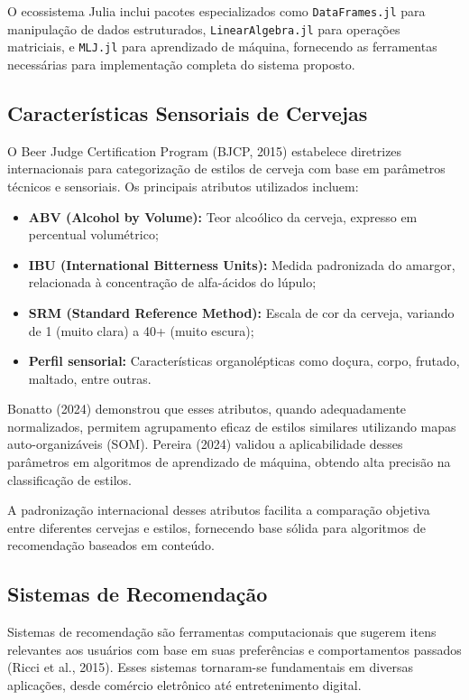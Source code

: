 \documentclass[12pt,a4paper]{article}
\begin{document}
O ecossistema Julia inclui pacotes especializados como \texttt{DataFrames.jl} para manipulação de dados estruturados, \texttt{LinearAlgebra.jl} para operações matriciais, e \texttt{MLJ.jl} para aprendizado de máquina, fornecendo as ferramentas necessárias para implementação completa do sistema proposto.

\subsection{Características Sensoriais de Cervejas}

O Beer Judge Certification Program (BJCP, 2015) estabelece diretrizes internacionais para categorização de estilos de cerveja com base em parâmetros técnicos e sensoriais. Os principais atributos utilizados incluem:

\begin{itemize}
\item \textbf{ABV (Alcohol by Volume):} Teor alcoólico da cerveja, expresso em percentual volumétrico;
\item \textbf{IBU (International Bitterness Units):} Medida padronizada do amargor, relacionada à concentração de alfa-ácidos do lúpulo;
\item \textbf{SRM (Standard Reference Method):} Escala de cor da cerveja, variando de 1 (muito clara) a 40+ (muito escura);
\item \textbf{Perfil sensorial:} Características organolépticas como doçura, corpo, frutado, maltado, entre outras.
\end{itemize}

Bonatto (2024) demonstrou que esses atributos, quando adequadamente normalizados, permitem agrupamento eficaz de estilos similares utilizando mapas auto-organizáveis (SOM). Pereira (2024) validou a aplicabilidade desses parâmetros em algoritmos de aprendizado de máquina, obtendo alta precisão na classificação de estilos.

A padronização internacional desses atributos facilita a comparação objetiva entre diferentes cervejas e estilos, fornecendo base sólida para algoritmos de recomendação baseados em conteúdo.

\subsection{Sistemas de Recomendação}

Sistemas de recomendação são ferramentas computacionais que sugerem itens relevantes aos usuários com base em suas preferências e comportamentos passados (Ricci et al., 2015). Esses sistemas tornaram-se fundamentais em diversas aplicações, desde comércio eletrônico até entretenimento digital.
\end{document}
